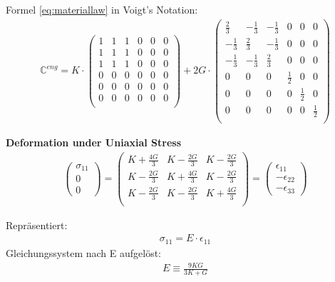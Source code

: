 	Formel \ref{eq:materiallaw} in Voigt's Notation:
	\begin{align}
		\mathbb{C}^{eng} = K \cdot \begin{pmatrix}
			1 & 1 & 1 & 0 & 0 & 0\\
			1 & 1 & 1 & 0 & 0 & 0\\
			1 & 1 & 1 & 0 & 0 & 0\\
			0 & 0 & 0 & 0 & 0 & 0\\
			0 & 0 & 0 & 0 & 0 & 0\\
			0 & 0 & 0 & 0 & 0 & 0\\
		\end{pmatrix}
		+ 2 G \cdot \begin{pmatrix}
			\frac{2}{3} & -\frac{1}{3} & -\frac{1}{3} & 0 & 0 & 0\\
			-\frac{1}{3} & \frac{2}{3} & -\frac{1}{3} & 0 & 0 & 0\\
			-\frac{1}{3} & -\frac{1}{3} & \frac{2}{3} & 0 & 0 & 0\\
			0 & 0 & 0 & \frac{1}{2} & 0 & 0\\
			0 & 0 & 0 & 0 & \frac{1}{2} & 0\\
			0 & 0 & 0 & 0 & 0 & \frac{1}{2}\\
		\end{pmatrix}
	\end{align}
	
	\textbf{Deformation under Uniaxial Stress}\\
	\begin{align}
		\begin{pmatrix}
			\sigma_{11}\\
			0\\
			0
		\end{pmatrix} = 
		\begin{pmatrix}
			K + \frac{4G}{3} & K - \frac{2G}{3} & K - \frac{2G}{3}\\
			K - \frac{2G}{3} & K + \frac{4G}{3} & K - \frac{2G}{3}\\
			K - \frac{2G}{3} & K - \frac{2G}{3} & K + \frac{4G}{3}\\
		\end{pmatrix} =
		\begin{pmatrix}
			\epsilon_{11}\\
			- \epsilon_{22}\\
			- \epsilon_{33}
		\end{pmatrix}
	\end{align}
	
	Repräsentiert:
	\begin{align}
		\sigma_{11} = E \cdot \epsilon_{11}
	\end{align}
	Gleichungssystem nach E aufgelöst:
	\begin{align}
		E \equiv \frac{9 K G}{3K + G}
	\end{align}
	
